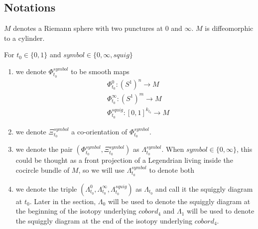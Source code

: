 \subsection*{Notations}
\begin{definition}
$M$ denotes a Riemann sphere with two punctures at $0$ and $\infty$. $M$ is diffeomorphic to a cylinder.
\end{definition}
\begin{definition}
For $t_0\in\{0,1\}$ and $symbol\in\{0,\infty, squig \}$
\begin{enumerate}
\item we denote $\Phi_{t_0}^{symbol}$ to be smooth maps
\begin{align*}
&\Phi_{t_0}^0 : (S^1)^n \rightarrow M \\
&\Phi_{t_0}^\infty : (S^1)^m \rightarrow M \\
&\Phi_{t_0}^{squig} : [0,1]^{k_{t_0}} \rightarrow M
\end{align*}

\item we denote $\Xi_{t_0}^{symbol}$ a co-orientation of $\Phi_{t_0}^{symbol}$.

\item we denote the pair $(\Phi_{t_0}^{symbol},\Xi_{t_0}^{symbol})$ as $\Lambda_{t_0}^{symbol}$. When $symbol \in \{0,\infty\}$, this could be thought as a front projection of a Legendrian living inside the cocircle bundle of $M$, so we will use $\Lambda_{t_0}^{symbol}$ to denote both

\item we denote the triple $(\Lambda_{t_0}^{0},\Lambda_{t_0}^{\infty},\Lambda_{t_0}^{squig})$ as $\Lambda_{t_0}$ and call it the squiggly diagram at $t_0$. Later in the section, $\Lambda_0$ will be used to denote the squiggly diagram at the beginning of the isotopy underlying $cobord_4$ and $\Lambda_1$ will be used to denote the squiggly diagram at the end of the isotopy underlying $cobord_4$. 
\end{enumerate}
\end{definition}

